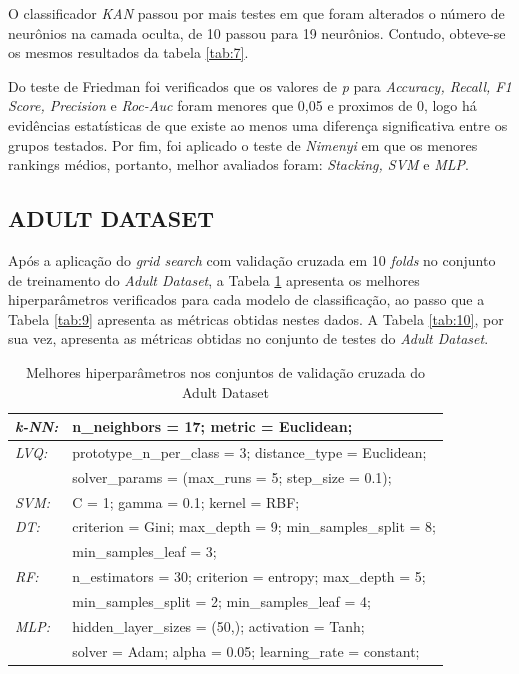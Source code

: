 \documentclass[journal]{IEEEtran}
\begin{document}
O classificador \textit{KAN} passou por mais testes em que foram alterados o número de neurônios na camada oculta, de 10 passou para 19 neurônios. Contudo, obteve-se os mesmos resultados da tabela \ref{tab:7}.

Do teste de Friedman foi verificados que os valores de \textit{p} para \textit{Accuracy, Recall, F1 Score, Precision} e \textit{Roc-Auc} foram menores que 0,05 e proximos de 0, logo há evidências estatísticas de que existe ao menos uma diferença significativa entre os grupos testados. Por fim, foi aplicado o teste de \textit{Nimenyi} em que os menores rankings médios, portanto, melhor avaliados foram: \textit{Stacking, SVM} e \textit{MLP}.


\subsection{ADULT DATASET}

Após a aplicação do \textit{grid search} com validação cruzada em 10 \textit{folds} no conjunto de treinamento do \textit{Adult Dataset}, a Tabela \ref{tab:8} apresenta os melhores hiperparâmetros verificados para cada modelo de classificação, ao passo que a Tabela \ref{tab:9} apresenta as métricas obtidas nestes dados. A Tabela \ref{tab:10}, por sua vez, apresenta as métricas obtidas no conjunto de testes do \textit{Adult Dataset}.

\begin{table}[h!]
	\caption{Melhores hiperparâmetros nos conjuntos de validação cruzada do Adult Dataset}
	\label{tab:8}
	\begin{tabular}{ l l }
		\hline
		\textit{k-NN:} & n\_neighbors = 17; metric = Euclidean;                     \\
		\hline
		\textit{LVQ:}  & prototype\_n\_per\_class = 3; distance\_type = Euclidean;  \\  & solver\_params = (max\_runs = 5; step\_size = 0.1);\\
		\hline
		\textit{SVM:}  & C = 1; gamma = 0.1; kernel = RBF;                          \\
		\hline
		\textit{DT:}   & criterion = Gini; max\_depth = 9; min\_samples\_split = 8; \\  & min\_samples\_leaf = 3;\\
		\hline
		\textit{RF:}   & n\_estimators = 30; criterion = entropy; max\_depth = 5;   \\  & min\_samples\_split = 2; min\_samples\_leaf = 4;\\
		\hline
		\textit{MLP:}  & hidden\_layer\_sizes = (50,); activation = Tanh;           \\  & solver = Adam; alpha = 0.05; learning\_rate = constant;\\
		\hline
	\end{tabular}
\end{table}
\end{document}
